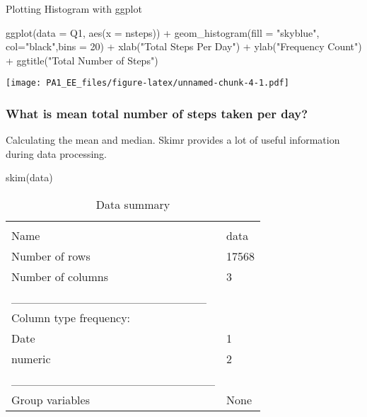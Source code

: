 \documentclass[
]{article}
\newenvironment{Shaded}{\begin{snugshade}}{\end{snugshade}}
\newcommand{\AttributeTok}[1]{\textcolor[rgb]{0.77,0.63,0.00}{#1}}
\newcommand{\DecValTok}[1]{\textcolor[rgb]{0.00,0.00,0.81}{#1}}
\newcommand{\FunctionTok}[1]{\textcolor[rgb]{0.00,0.00,0.00}{#1}}
\newcommand{\NormalTok}[1]{#1}
\newcommand{\SpecialCharTok}[1]{\textcolor[rgb]{0.00,0.00,0.00}{#1}}
\newcommand{\StringTok}[1]{\textcolor[rgb]{0.31,0.60,0.02}{#1}}
\begin{document}
Plotting Histogram with ggplot

\begin{Shaded}
\begin{Highlighting}[]
\FunctionTok{ggplot}\NormalTok{(}\AttributeTok{data =}\NormalTok{ Q1, }\FunctionTok{aes}\NormalTok{(}\AttributeTok{x =}\NormalTok{ nsteps)) }\SpecialCharTok{+}
  \FunctionTok{geom\_histogram}\NormalTok{(}\AttributeTok{fill =} \StringTok{"skyblue"}\NormalTok{, }\AttributeTok{col=}\StringTok{"black"}\NormalTok{,}\AttributeTok{bins =} \DecValTok{20}\NormalTok{) }\SpecialCharTok{+}
  \FunctionTok{xlab}\NormalTok{(}\StringTok{"Total Steps Per Day"}\NormalTok{) }\SpecialCharTok{+}
  \FunctionTok{ylab}\NormalTok{(}\StringTok{"Frequency Count"}\NormalTok{) }\SpecialCharTok{+}
  \FunctionTok{ggtitle}\NormalTok{(}\StringTok{"Total Number of Steps"}\NormalTok{)}
\end{Highlighting}
\end{Shaded}

\texttt{[image: PA1\_EE\_files/figure-latex/unnamed-chunk-4-1.pdf]}

\hypertarget{what-is-mean-total-number-of-steps-taken-per-day}{%
\subsubsection{What is mean total number of steps taken per
day?}\label{what-is-mean-total-number-of-steps-taken-per-day}}

Calculating the mean and median. Skimr provides a lot of useful
information during data processing.

\begin{Shaded}
\begin{Highlighting}[]
\FunctionTok{skim}\NormalTok{(data)}
\end{Highlighting}
\end{Shaded}

\begin{longtable}[]{@{}ll@{}}
\caption{Data summary}\tabularnewline
\toprule
& \\
\midrule
\endfirsthead
\toprule
& \\
\midrule
\endhead
Name & data \\
Number of rows & 17568 \\
Number of columns & 3 \\
\_\_\_\_\_\_\_\_\_\_\_\_\_\_\_\_\_\_\_\_\_\_\_ & \\
Column type frequency: & \\
Date & 1 \\
numeric & 2 \\
\_\_\_\_\_\_\_\_\_\_\_\_\_\_\_\_\_\_\_\_\_\_\_\_ & \\
Group variables & None \\
\bottomrule
\end{longtable}
\end{document}
